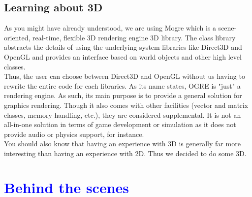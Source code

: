 \documentclass[article]{report} %
\begin{document}
						\section{Learning about 3D}
								As you might have already understood, we are using \ac{Mogre} which is a scene-oriented, real-time, flexible 3D rendering engine 3D library.\newline
								The class library abstracts the details of using the underlying system libraries like Direct3D and OpenGL and provides an interface based on world objects and other high level classes.\\
								
								Thus, the user can choose between Direct3D and OpenGL without us having to rewrite the entire code for each libraries. As its name states, \ac{OGRE} is "just" a rendering engine. As such, its main purpose is to provide a general solution for graphics rendering. Though it also comes with other facilities (vector and matrix classes, memory handling, etc.), they are considered supplemental. It is not an all-in-one solution in terms of game development or simulation as it does not provide audio or physics support, for instance.\\
								
								You should also know that having an experience with 3D is generally far more interesting than having an experience with 2D. Thus we decided to do some 3D.
								
								
				\chapter{\textcolor{blue}{Behind the scenes}}
				
\end{document}
